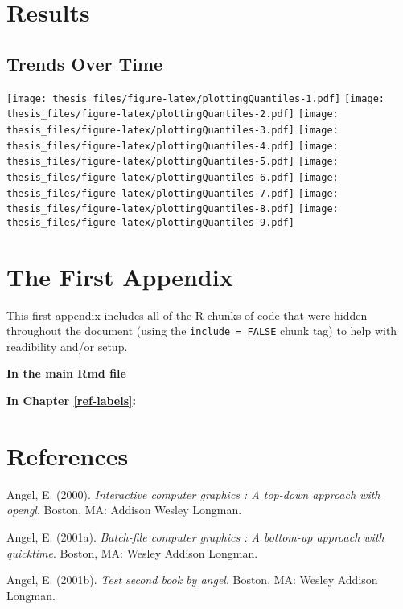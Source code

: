 \documentclass[12pt,twoside]{dukestatscithesis}
\theoremstyle{definition}
\theoremstyle{definition}
\theoremstyle{definition}
\theoremstyle{remark}
\begin{document}
\chapter{Results}\label{organization}

\section{Trends Over Time}\label{trends-over-time}

\texttt{[image: thesis\_files/figure-latex/plottingQuantiles-1.pdf]}
\texttt{[image: thesis\_files/figure-latex/plottingQuantiles-2.pdf]}
\texttt{[image: thesis\_files/figure-latex/plottingQuantiles-3.pdf]}
\texttt{[image: thesis\_files/figure-latex/plottingQuantiles-4.pdf]}
\texttt{[image: thesis\_files/figure-latex/plottingQuantiles-5.pdf]}
\texttt{[image: thesis\_files/figure-latex/plottingQuantiles-6.pdf]}
\texttt{[image: thesis\_files/figure-latex/plottingQuantiles-7.pdf]}
\texttt{[image: thesis\_files/figure-latex/plottingQuantiles-8.pdf]}
\texttt{[image: thesis\_files/figure-latex/plottingQuantiles-9.pdf]}

\appendix

\chapter{The First Appendix}\label{the-first-appendix}

This first appendix includes all of the R chunks of code that were
hidden throughout the document (using the \texttt{include\ =\ FALSE}
chunk tag) to help with readibility and/or setup.

\textbf{In the main Rmd file}

\textbf{In Chapter \ref{ref-labels}:}

\backmatter

\chapter*{References}\label{references}


\noindent

\setlength{\parindent}{-0.20in} \setlength{\leftskip}{0.20in}
\setlength{\parskip}{8pt}

\hypertarget{refs}{}
\hypertarget{ref-angel2000}{}
Angel, E. (2000). \emph{Interactive computer graphics : A top-down
approach with opengl}. Boston, MA: Addison Wesley Longman.

\hypertarget{ref-angel2001}{}
Angel, E. (2001a). \emph{Batch-file computer graphics : A bottom-up
approach with quicktime}. Boston, MA: Wesley Addison Longman.

\hypertarget{ref-angel2002a}{}
Angel, E. (2001b). \emph{Test second book by angel}. Boston, MA: Wesley
Addison Longman.


\end{document}
